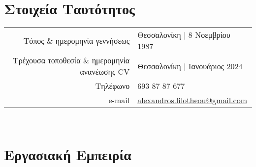 \documentclass[a4paper,10pt,twoside]{article}
\begin{document}


\par{\bigskip\par}

\section{Στοιχεία Ταυτότητος}

\begin{tabular}{rp{10cm}}
Τόπος $\&$ ημερομηνία γεννήσεως                 & Θεσσαλονίκη | 8 Νοεμβρίου 1987 \\
Τρέχουσα τοποθεσία $\&$ ημερομηνία ανανέωσης CV & Θεσσαλονίκη | Ιανουάριος 2024\\
Τηλέφωνο                                        & 693 87 87 677 \\
e-mail                                          & \href{mailto:alexandros.filotheou@gmail.com}{alexandros.filotheou@gmail.com}
\end{tabular}\\


\section{Εργασιακή Εμπειρία}
\end{document}
